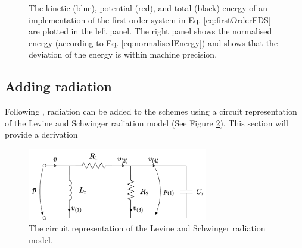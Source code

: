 {\begin{figure}[h]
      \caption{The kinetic (blue), potential (red), and total (black) energy of an implementation of the first-order system in Eq. \eqref{eq:firstOrderFDS} are plotted in the left panel. The right panel shows the normalised energy (according to Eq. \eqref{eq:normalisedEnergy}) and shows that the deviation of the energy is within machine precision. \label{fig:energyFirstOrder}}
\end{figure}

\subsection{Adding radiation}
\def\r{\text{r}}
\def\one{{(1)}}
Following \cite{Harrison2018}, radiation  can be added to the schemes using a circuit representation of the Levine and Schwinger radiation model (See Figure \ref{fig:circuit}). This section will provide a derivation 

\begin{figure}[h]
    \centering
    \includegraphics[width=0.7\textwidth]{figures/resonators/brass/circuit.pdf}
    \caption{The circuit representation of the Levine and Schwinger radiation model. \label{fig:circuit}}
\end{figure}

}
